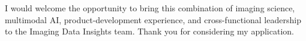 \documentclass[10pt, letter]{ag-cv} %
\begin{document}
\begin{cvletter}
\begin{flushleft}
I would welcome the opportunity to bring this combination of imaging science, multimodal AI, product-development experience, and cross-functional leadership to the Imaging Data Insights team. Thank you for considering my application.

\end{flushleft}

\end{cvletter}


\makeletterclosing %
\end{document}
